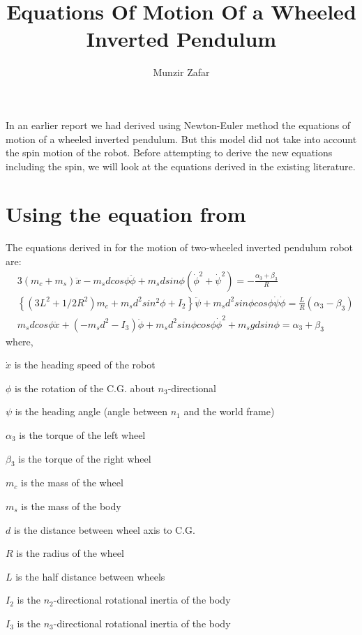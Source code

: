 \documentclass[a4paper,10pt]{article}
\title{Equations Of Motion Of a Wheeled Inverted Pendulum}
\author{Munzir Zafar}
\begin{document}
\maketitle

In an earlier report \cite{munzir2013balancing} we had derived using Newton-Euler method the equations of
motion of a wheeled inverted pendulum. But this model did not take into account the spin motion of the
robot. Before attempting to derive the new equations including the spin, we will look at the equations
derived in the existing literature.

\section{Using the equation from \cite{kim2005dynamic}}

The equations derived in \cite{kim2005dynamic} for the motion of two-wheeled inverted pendulum robot are:
\begin{align}
 &3(m_c+m_s)\ddot{x}-m_sdcos\phi\ddot{\phi}+m_sdsin\phi({\dot{\phi}}^2+{\dot{\psi}}^2)=-\frac{\alpha_3+\beta_3}{R} \label{eq1}\\
 &\left\lbrace(3L^2+1/2R^2)m_c+m_sd^2sin^2\phi+I_2\right\rbrace\ddot{\psi}+m_sd^2sin\phi cos\phi\dot{\psi}\dot{\phi}=\frac{L}{R}(\alpha_3-\beta_3) \label{eq2}\\
 &m_sdcos\phi\ddot{x}+(-m_sd^2-I_3)\ddot{\phi}+m_sd^2sin\phi cos\phi {\dot{\phi}}^2+m_sgdsin\phi=\alpha_3+\beta_3 \label{eq3}
\end{align} where,

$\dot{x}$ is the heading speed of the robot 

$\phi$ is the rotation of the C.G. about $n_3$-directional 

$\psi$ is the heading angle (angle between $n_1$ and the world frame) 

$\alpha_3$ is the torque of the left wheel 

$\beta_3$ is the torque of the right wheel 

$m_c$ is the mass of the wheel 

$m_s$ is the mass of the body 

$d$ is the distance between wheel axis to C.G. 

$R$ is the radius of the wheel 

$L$ is the half distance between wheels 

$I_2$ is the $n_2$-directional rotational inertia of the body 

$I_3$ is the $n_3$-directional rotational inertia of the body 
\end{document}

